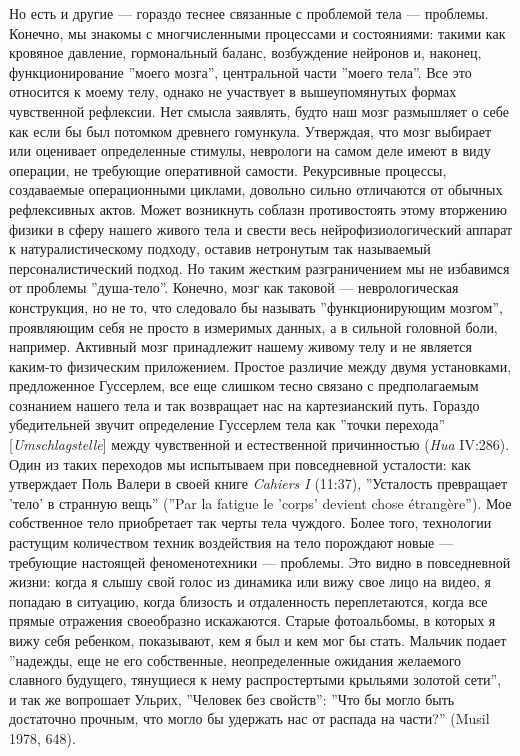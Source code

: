 \documentclass[12pt]{book}
\begin{document}
Но есть и другие --- гораздо теснее связанные с проблемой тела --- проблемы. Конечно, мы знакомы с многчисленными процессами и состояниями: такими как кровяное давление, гормональный баланс, возбуждение нейронов и, наконец, функционирование ''моего мозга'', центральной части ''моего тела''. Все это относится к моему телу, однако не участвует в вышеупомянутых формах чувственной рефлексии. Нет смысла заявлять, будто наш мозг размышляет о себе как если бы был потомком древнего гомункула. Утверждая, что мозг выбирает или оценивает определенные стимулы, неврологи на самом деле имеют в виду операции, не требующие оперативной самости. Рекурсивные процессы, создаваемые операционными циклами, довольно сильно отличаются от обычных рефлексивных актов. Может возникнуть соблазн противостоять этому вторжению физики в сферу нашего живого тела и свести весь нейрофизиологический аппарат к натуралистическому подходу, оставив нетронутым так называемый персоналистический подход. Но таким жестким разграничением мы не избавимся от проблемы ''душа-тело''. Конечно, мозг как таковой --- неврологическая конструкция, но не то, что следовало бы называть ''функционирующим мозгом'', проявляющим себя не просто в измеримых данных, а в сильной головной боли, например. Активный мозг принадлежит нашему живому телу и не является каким-то физическим приложением. Простое различие между двумя установками, предложенное Гуссерлем, все еще слишком тесно связано с предполагаемым сознанием нашего тела и так возвращает нас на картезианский путь. Гораздо убедительней звучит определение Гуссерлем тела как ''точки перехода'' [\textit{Umschlagstelle}] между чувственной и естественной причинностью (\textit{Hua} IV:286). Один из таких переходов мы испытываем при повседневной усталости: как утверждает Поль Валери в своей книге \textit{Cahiers I} (11:37), ''Усталость превращает 'тело' в странную вещь'' (''Par la fatigue le 'corps' devient chose étrangère''). Мое собственное тело приобретает так черты тела чуждого. Более того, технологии растущим количеством техник воздействия на тело порождают новые --- требующие настоящей феноменотехники --- проблемы. Это видно в повседневной жизни: когда я слышу свой голос из динамика или вижу свое лицо на видео, я попадаю в ситуацию, когда близость и отдаленность переплетаются, когда все прямые отражения своеобразно искажаются. Старые фотоальбомы, в которых я вижу себя ребенком, показывают, кем я был и кем мог бы стать. Мальчик подает ''надежды, еще не его собственные, неопределенные ожидания желаемого славного будущего, тянущиеся к нему распростертыми крыльями золотой сети'', и так же вопрошает Ульрих, ''Человек без свойств'': ''Что бы могло быть достаточно прочным, что могло бы удержать нас от распада на части?'' (Musil 1978, 648).
\end{document}
